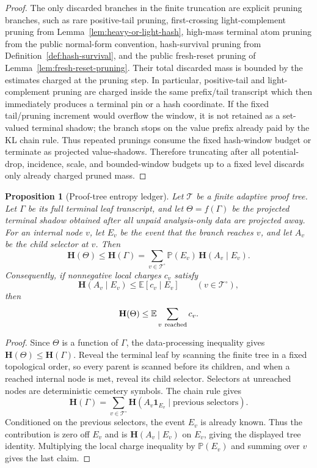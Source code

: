 \documentclass[11pt]{article}
\newtheorem{proposition}[theorem]{Proposition}
\newcommand{\Prb}{\mathbb P}
\newcommand{\EE}{\mathbb E}
\newcommand{\bfH}{\mathbf H}
\begin{document}
\begin{proof}
The only discarded branches in the finite truncation are explicit pruning
branches, such as rare positive-tail pruning, first-crossing light-complement
pruning from Lemma~\ref{lem:heavy-or-light-hash}, high-mass terminal
atom pruning from the public normal-form convention, hash-survival pruning
from Definition~\ref{def:hash-survival}, and the public fresh-reset pruning of
Lemma~\ref{lem:fresh-reset-pruning}.  Their total discarded mass is
bounded by the estimates charged at the pruning step.  In particular,
positive-tail and light-complement pruning are charged inside the same
prefix/tail transcript which then immediately produces a terminal pin or a hash
coordinate.  If the fixed tail/pruning increment would overflow the window, it
is not retained as a set-valued terminal shadow; the branch stops on the value
prefix already paid by the KL chain rule.  Thus repeated prunings consume the
fixed hash-window budget or terminate as projected value-shadows.  Therefore
truncating after all potential-drop, incidence, scale, and bounded-window
budgets up to a fixed level discards only already charged pruned mass.
\end{proof}

\begin{proposition}[Proof-tree entropy ledger]
\label{prop:tree-entropy-ledger}
Let $\mathcal T$ be a finite adaptive proof tree.  Let $\Gamma$ be its full
terminal leaf transcript, and let $\Theta=f(\Gamma)$ be the projected
terminal shadow obtained after all unpaid analysis-only data are projected
away.  For an
internal node $v$, let $E_v$ be the event that the branch reaches $v$, and
let $A_v$ be the child selector at $v$.  Then
\[
  \bfH(\Theta)
  \le
  \bfH(\Gamma)
  =
  \sum_{v\in\mathcal T^\circ}
  \Prb(E_v)\,\bfH(A_v\mid E_v).
\]
Consequently, if nonnegative local charges $c_v$ satisfy
\[
  \bfH(A_v\mid E_v)
  \le
  \EE[c_v\mid E_v]
  \qquad(v\in\mathcal T^\circ),
\]
then
\[
  \bfH(\Theta)
  \le
  \EE\sum_{v\ {\rm reached}} c_v .
\]
\end{proposition}

\begin{proof}
Since $\Theta$ is a function of $\Gamma$, the data-processing inequality gives
$\bfH(\Theta)\le\bfH(\Gamma)$.  Reveal the terminal leaf by scanning the
finite tree in a fixed topological order, so every parent is scanned before its
children, and when a reached internal node is met, reveal its child selector.
Selectors at unreached nodes are deterministic cemetery symbols.  The chain rule gives
\[
  \bfH(\Gamma)
  =
  \sum_{v\in\mathcal T^\circ}
  \bfH(A_v\mathbf 1_{E_v}\mid \text{previous selectors}).
\]
Conditioned on the previous selectors, the event $E_v$ is already known.
Thus the contribution is zero off $E_v$ and is
$\bfH(A_v\mid E_v)$ on $E_v$, giving the displayed tree identity.  Multiplying
the local charge inequality by $\Prb(E_v)$ and summing over $v$ gives the last
claim.
\end{proof}
\end{document}
